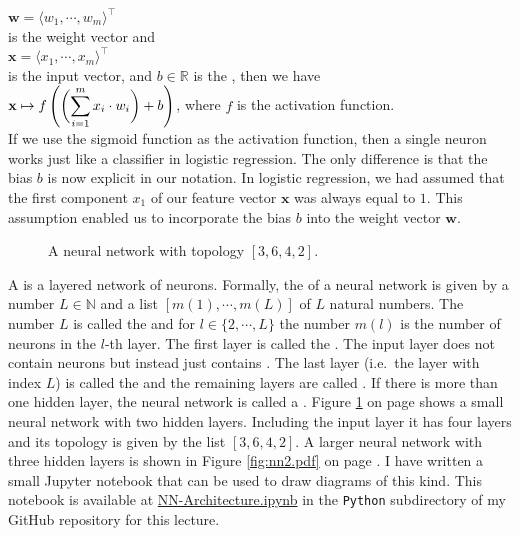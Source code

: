 \hspace*{1.3cm}
$\mathbf{w} = \langle w_1, \cdots, w_m \rangle^\top$ 
\\[0.2cm]
is the weight vector and 
\\[0.2cm]
\hspace*{1.3cm}
$\mathbf{x} = \langle x_1, \cdots, x_m \rangle^\top$
\\[0.2cm]
is the input vector, and $b\in \mathbb{R}$ is the ,  then we have
\\[0.2cm]
\hspace*{1.3cm}
$\displaystyle \mathbf{x} \mapsto f\left(\biggl(\sum\limits_{i=1}^m x_i \cdot w_i\biggr) + b\right)$, \quad where $f$ is
the activation function.
\\[0.2cm]
If we use the sigmoid function as the activation function, then 
a single neuron works just like a classifier in logistic regression.  The only difference is that the bias $b$
is now explicit in our notation.  In logistic regression, we had assumed that the first component $x_1$ of our
feature vector $\mathbf{x}$ was always equal to $1$.  This assumption enabled us to incorporate the bias $b$ into the
weight vector $\mathbf{w}$.

\begin{figure}[!h]
  \centering
  \vspace*{-2cm}
    \vspace*{-2cm}
   \caption{A neural network with topology $[3, 6, 4, 2]$.}
  \label{fig:nn1.pdf}
\end{figure}

A   is a layered network of neurons.
Formally, the   of a neural network is 
given by a number $L \in \mathbb{N}$ and a list $[m(1), \cdots, m(L)]$ of $L$ natural numbers.  The number
$L$ is called the   and for $l \in \{2,\cdots,L\}$ the number $m(l)$ is the number of
neurons in the $l$-th layer.  The first layer is called the . 
The input layer does not contain neurons but instead just contains .  The
last layer (i.e.~the layer with index $L$) is called the   and the
remaining layers are called .   If there is more than one hidden layer,
the neural network is called a .  Figure \ref{fig:nn1.pdf}
on page \pageref{fig:nn1.pdf} shows a small neural network with two hidden layers.  Including the input layer
it has four layers and its topology is given by the list $[3, 6, 4, 2]$.  A larger neural network with three
hidden layers is shown in Figure \ref{fig:nn2.pdf} on page \pageref{fig:nn2.pdf}.  I have written a small
Jupyter notebook that can be used to draw diagrams of this kind. This notebook is available at
\href{https://github.com/karlstroetmann/Artificial-Intelligence/blob/master/Python/Chapter-07/NN-Architecture.ipynb}{NN-Architecture.ipynb}
in the \texttt{Python} subdirectory of my GitHub repository for this lecture. 


